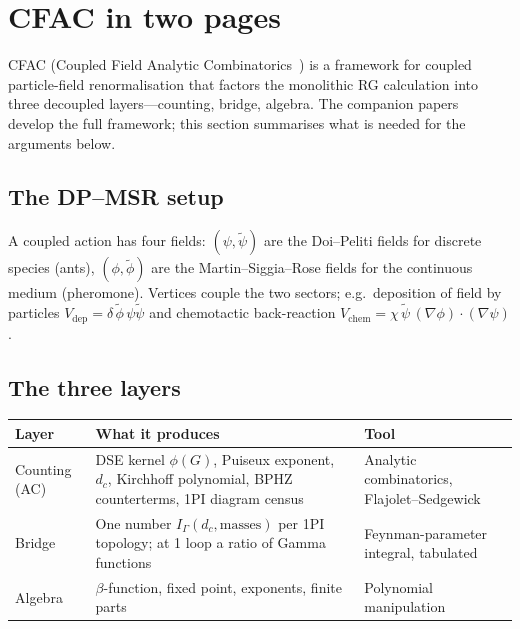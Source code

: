 \documentclass[10pt,a4paper,twocolumn]{article}
\newcommand{\phit}{\tilde\phi}
\newcommand{\psit}{\tilde\psi}
\theoremstyle{definition}
\begin{document}
\section{CFAC in two pages}\label{sec:cfac-brief}

CFAC (Coupled Field Analytic Combinatorics~\citep{Amarteifio2026cfac})
is a framework for coupled particle-field renormalisation that
factors the monolithic RG calculation into three decoupled
layers---counting, bridge, algebra.  The companion
papers~\citep{Amarteifio2026cfac,Amarteifio2026cfactheorem} develop
the full framework; this section summarises what is needed for
the arguments below.

\subsection{The DP--MSR setup}
A coupled action has four fields: $(\psi, \psit)$ are the
Doi--Peliti fields for discrete species (ants), $(\phi, \phit)$
are the Martin--Siggia--Rose fields for the continuous medium
(pheromone).  Vertices couple the two sectors; e.g.\ deposition
of field by particles $V_{\text{dep}} = \delta\,\phit\,\psi\psit$
and chemotactic back-reaction $V_{\text{chem}} = \chi\,
\psit\,(\nabla\phi)\cdot(\nabla\psi)$.

\subsection{The three layers}
\begin{table}[t]
\centering
\small
\renewcommand{\arraystretch}{1.3}
\begin{tabular}{@{}p{2.2cm}p{8.5cm}p{5.5cm}@{}}
\toprule
\textbf{Layer} & \textbf{What it produces} & \textbf{Tool} \\
\midrule
Counting (AC)
  & DSE kernel $\phi(G)$, Puiseux exponent, $d_c$,
    Kirchhoff polynomial, BPHZ counterterms, 1PI diagram census
  & Analytic combinatorics,
    Flajolet--Sedgewick~\citep{FlajoletSedgewick2009} \\
\midrule
Bridge
  & One number $I_\Gamma(d_c,\text{masses})$ per 1PI topology;
    at 1 loop a ratio of Gamma functions
  & Feynman-parameter integral, tabulated \\
\midrule
Algebra
  & $\beta$-function, fixed point, exponents, finite parts
  & Polynomial manipulation \\
\bottomrule
\end{tabular}
\end{table}
\end{document}
